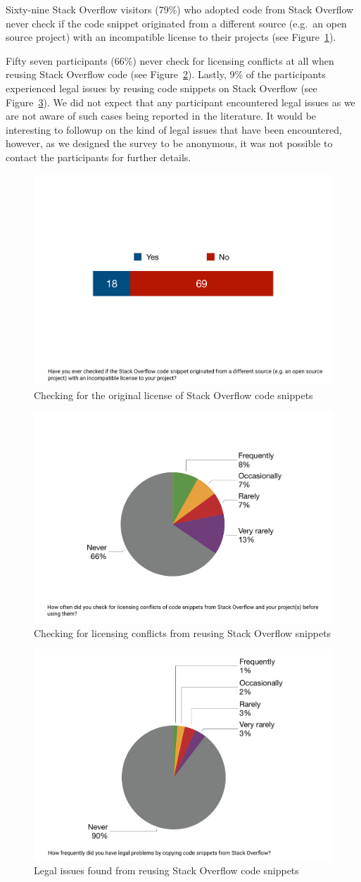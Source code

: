 \documentclass{svjour3}                     %
\begin{document}
Sixty-nine Stack Overflow visitors (79\%) who adopted code from Stack Overflow
never check if the code snippet originated from a different source (e.g.\ an open
source project) with an incompatible license to their projects (see
Figure~\ref{fig:survey_visitor_original_license}).

Fifty seven participants (66\%) never check for licensing conflicts at all
when reusing Stack Overflow code (see
Figure~\ref{fig:survey_visitor_licensing_conflict_check}). Lastly, 9\% of
the participants experienced legal issues by reusing code snippets on Stack
Overflow (see Figure~\ref{fig:survey_visitor_legal_issue}). We did not
expect that any participant encountered legal issues as we are not
aware of such cases being reported in the literature. It would
be interesting to followup on the kind of legal issues that have been
encountered, however, as we designed the
survey to be anonymous, it was not possible to contact the participants for further details.

\begin{figure} \centering
	\includegraphics[width=.4\linewidth]{survey_visitor_original_license} 
	\caption{Checking for the original license of Stack Overflow code snippets}
	\label{fig:survey_visitor_original_license} 
\end{figure}

\begin{figure} \centering
	\includegraphics[width=.4\linewidth]{survey_visitor_licensing_conflict_check} 
	\caption{Checking for licensing conflicts from reusing Stack Overflow snippets}
	\label{fig:survey_visitor_licensing_conflict_check} 
\end{figure}

\begin{figure} \centering
	\includegraphics[width=.4\linewidth]{survey_visitor_legal_issue} 
	\caption{Legal issues found from reusing Stack Overflow code snippets}
	\label{fig:survey_visitor_legal_issue} 
\end{figure}
\end{document}
